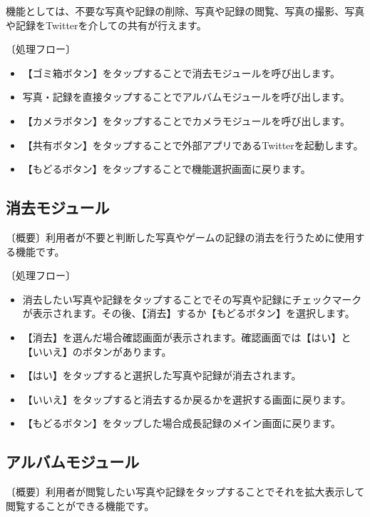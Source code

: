 \documentclass[a4j]{jarticle}
\begin{document}
機能としては、不要な写真や記録の削除、写真や記録の閲覧、写真の撮影、写真や記録をTwitterを介しての共有が行えます。

〔処理フロー〕
\begin{itemize}
\item 【ゴミ箱ボタン】をタップすることで消去モジュールを呼び出します。

\item 写真・記録を直接タップすることでアルバムモジュールを呼び出します。

\item 【カメラボタン】をタップすることでカメラモジュールを呼び出します。

\item 【共有ボタン】をタップすることで外部アプリであるTwitterを起動します。

\item 【もどるボタン】をタップすることで機能選択画面に戻ります。
\end{itemize}

\subsection{消去モジュール}
〔概要〕利用者が不要と判断した写真やゲームの記録の消去を行うために使用する機能です。

〔処理フロー〕
\begin{itemize}
\item 消去したい写真や記録をタップすることでその写真や記録にチェックマークが表示されます。その後、【消去】するか【もどるボタン】を選択します。
\item 【消去】を選んだ場合確認画面が表示されます。確認画面では【はい】と【いいえ】のボタンがあります。
\item 【はい】をタップすると選択した写真や記録が消去されます。
\item 【いいえ】をタップすると消去するか戻るかを選択する画面に戻ります。
\item 【もどるボタン】をタップした場合成長記録のメイン画面に戻ります。
\end{itemize}

\subsection{アルバムモジュール}
〔概要〕利用者が閲覧したい写真や記録をタップすることでそれを拡大表示して閲覧することができる機能です。
\end{document}
